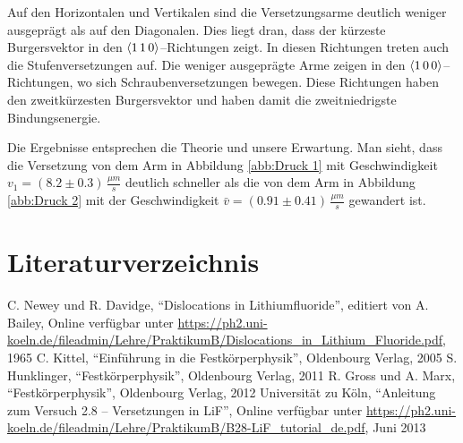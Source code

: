 \documentclass[12pt,a4paper]{scrartcl}
\numberwithin{equation}{section} %
\begin{document}
Auf den Horizontalen und Vertikalen sind die Versetzungsarme deutlich weniger ausgeprägt als auf den Diagonalen. Dies liegt dran, dass der kürzeste Burgersvektor in den $\expval{1\,1\,0}$--Richtungen zeigt. In diesen Richtungen treten auch die Stufenversetzungen auf. Die weniger ausgeprägte Arme zeigen in den $\expval{1\,0\,0}$--Richtungen, wo sich Schraubenversetzungen bewegen. Diese Richtungen haben den zweitkürzesten Burgersvektor und haben damit die zweitniedrigste Bindungsenergie.

Die Ergebnisse entsprechen die Theorie und unsere Erwartung. Man sieht, dass die Versetzung von dem Arm in Abbildung \ref{abb:Druck 1} mit Geschwindigkeit $v_1=(8.2 \pm 0.3) \,\frac{\mu m}{s}$ deutlich schneller als die von dem Arm in Abbildung \ref{abb:Druck 2} mit der Geschwindigkeit $\bar{v}=(0.91 \pm 0.41) \,\frac{\mu m}{s}$ gewandert ist.

\clearpage
\hypertarget{literaturverzeichnis}{%
	\section{Literaturverzeichnis}\label{literaturverzeichnis}}
\renewcommand{\section}[2]{} %
\begin{thebibliography}{9}
	 C. Newey und R. Davidge, ``Dislocations in Lithiumfluoride'', editiert von
	A. Bailey, Online verfügbar unter
	\url{https://ph2.uni-koeln.de/fileadmin/Lehre/PraktikumB/Dislocations_in_Lithium_Fluoride.pdf}, 1965
	C. Kittel, ``Einführung in die Festkörperphysik'', Oldenbourg Verlag, 2005
	S. Hunklinger, ``Festkörperphysik'', Oldenbourg Verlag, 2011
	R. Gross und A. Marx, ``Festkörperphysik'', Oldenbourg Verlag, 2012
	Universität zu Köln, ``Anleitung zum Versuch 2.8 -- Versetzungen in
	LiF'', Online verfügbar unter
	\url{https://ph2.uni-koeln.de/fileadmin/Lehre/PraktikumB/B28-LiF_tutorial_de.pdf}, Juni 2013
\end{thebibliography}
\end{document}
